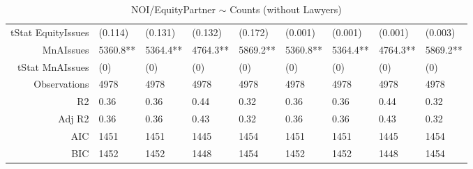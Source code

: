 \begin{table}[ht]
\begin{tabular}{rllllllll}
  tStat EquityIssues & (0.114) & (0.131) & (0.132) & (0.172) & (0.001) & (0.001) & (0.001) & (0.003) \\ 
  MnAIssues & 5360.8** & 5364.4** & 4764.3** & 5869.2** & 5360.8** & 5364.4** & 4764.3** & 5869.2** \\ 
  tStat MnAIssues & (0) & (0) & (0) & (0) & (0) & (0) & (0) & (0) \\ 
  Observations & 4978 & 4978 & 4978 & 4978 & 4978 & 4978 & 4978 & 4978 \\ 
  R2 & 0.36 & 0.36 & 0.44 & 0.32 & 0.36 & 0.36 & 0.44 & 0.32 \\ 
  Adj R2 & 0.36 & 0.36 & 0.43 & 0.32 & 0.36 & 0.36 & 0.43 & 0.32 \\ 
  AIC & 1451 & 1451 & 1445 & 1454 & 1451 & 1451 & 1445 & 1454 \\ 
  BIC & 1452 & 1452 & 1448 & 1454 & 1452 & 1452 & 1448 & 1454 \\ 
   \hline
\end{tabular}
\caption{NOI/EquityPartner $\sim$ Counts (without Lawyers)} 
\end{table}

